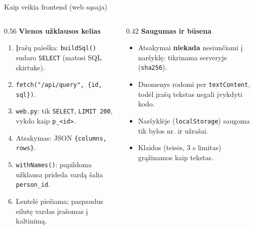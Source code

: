 \documentclass[hyperref={breaklinks=true},fleqn,mathserif]{beamer}
\begin{document}
\begin{frame}{Kaip veikia frontend (web sąsaja)}
\vspace{-2mm}
\begin{columns}[T]
\begin{column}{0.56\textwidth}
\scriptsize
\textbf{Vienos užklausos kelias}
\begin{enumerate}
    \setlength{\itemsep}{0pt}
    \item Įrašų paieška: \texttt{buildSql()} sudaro \texttt{SELECT} (matosi SQL skirtuke).
    \item \texttt{fetch("/api/query", \{id, sql\})}.
    \item \texttt{web.py}: tik \texttt{SELECT}, \texttt{LIMIT 200}, vykdo kaip \texttt{p\_<id>}.
    \item Atsakymas: JSON \texttt{\{columns, rows\}}.
    \item \texttt{withNames()}: papildoma užklausa prideda vardą šalia \texttt{person\_id}.
    \item Lentelė piešiama; paspaudus eilutę vardas įrašomas į kaltinimą.
\end{enumerate}
\end{column}
\begin{column}{0.42\textwidth}
\scriptsize
\textbf{Saugumas ir būsena}
\begin{itemize}
    \setlength{\itemsep}{0pt}
    \item Atsakymai \textbf{niekada} nesiunčiami į naršyklę: tikrinama serveryje (\texttt{sha256}).
    \item Duomenys rodomi per \texttt{textContent}, todėl įrašų tekstas negali įvykdyti kodo.
    \item Naršyklėje (\texttt{localStorage}) saugoma tik bylos nr. ir užrašai.
    \item Klaidos (teisės, 3 s limitas) grąžinamos kaip tekstas.
\end{itemize}
\end{column}
\end{columns}

\end{frame}
\end{document}
